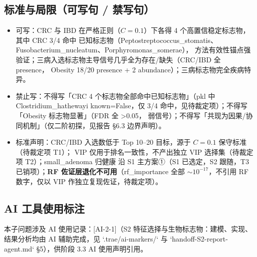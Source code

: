 \documentclass{article}   %
\begin{document}
\subsection{标准与局限（可写句 / 禁写句）}

\begin{itemize}
  \item 可写：CRC 与 IBD 在严格正则（$C=0.1$）下各得 4 个高置信稳定标志物，其中 CRC 3/4 命中
        已知标志物（Peptostreptococcus\_stomatis、Fusobacterium\_nucleatum、Porphyromonas\_somerae），
        方法有效性锚点强验证；三病入选标志物主导信号几乎全为存在/缺失（CRC/IBD 全 presence，
        Obesity 18/20 presence + 2 abundance）；三病标志物完全疾病特异。
  \item 禁止写：不得写「CRC 4 个标志物全部命中已知标志物」（pkl 中 Clostridium\_hathewayi
        known=False，仅 3/4 命中，见待裁定项）；不得写「Obesity 标志物显著」（FDR 全 >0.05，
        弱信号）；不得写「共现为因果/协同机制」（仅二阶初探，见报告 §6.3 边界声明）。
  \item 标准声明：CRC/IBD 入选数低于 Top 10--20 目标，源于 $C=0.1$ 保守标准（待裁定项 T1）；
        VIP 仅用于排名一致性，不产出独立 VIP 选择集（待裁定项 T2）；small\_adenoma 归健康
        沿 S1 主方案①（S1 已选定，S2 跟随，T3 已销项）；\textbf{RF 佐证层退化不可用}（rf\_importance 全部
        $\sim10^{-17}$，不引用 RF 数字，仅以 VIP 作独立复现佐证，待裁定项）。
\end{itemize}

\subsection{AI 工具使用标注}

本子问题涉及 AI 使用记录：[AI-2-1]（S2 特征选择与生物标志物：建模、实现、结果分析均由 AI 辅助完成，见 `.trae/ai-markers/` 与 `handoff-S2-report-agent.md` §5），供阶段 3.3 AI 使用声明引用。
\end{document}
